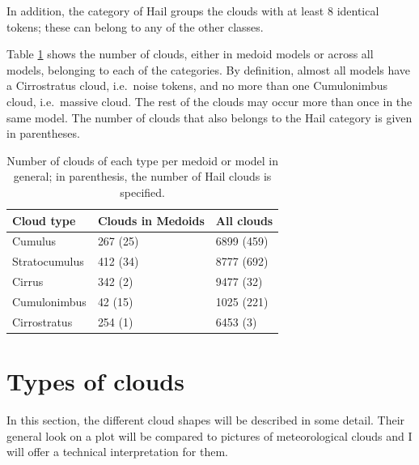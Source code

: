 \documentclass[
]{book}
\begin{document}
In addition, the category of Hail groups the clouds with at least 8 identical tokens; these can belong to any of the other classes.

Table \ref{tab:cloudFreqs} shows the number of clouds, either in medoid models or across all models, belonging to each of the categories. By definition, almost all models have a Cirrostratus cloud, i.e.~noise tokens, and no more than one Cumulonimbus cloud, i.e.~massive cloud. The rest of the clouds may occur more than once in the same model. The number of clouds that also belongs to the Hail category is given in parentheses.

\begin{table}

\caption{\label{tab:cloudFreqs}Number of clouds of each type per medoid or model in general; in parenthesis, the number of Hail clouds is specified.}
\centering
\begin{tabular}[t]{lll}
\toprule
Cloud type & Clouds in Medoids & All clouds\\
\midrule
Cumulus & 267 (25) & 6899 (459)\\
Stratocumulus & 412 (34) & 8777 (692)\\
Cirrus & 342 (2) & 9477 (32)\\
Cumulonimbus & 42 (15) & 1025 (221)\\
Cirrostratus & 254 (1) & 6453 (3)\\
\bottomrule
\end{tabular}
\end{table}

\hypertarget{cloud-types}{%
\section{Types of clouds}\label{cloud-types}}

In this section, the different cloud shapes will be described in some detail. Their general look on a plot will be compared to pictures of meteorological clouds and I will offer a technical interpretation for them.
\end{document}

